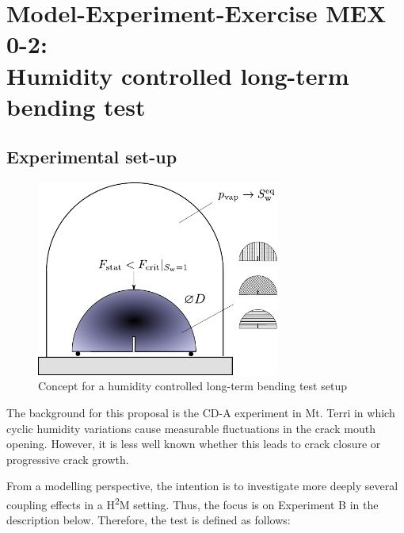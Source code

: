 \section[MEX 0-2: Humidity controlled long-term bending test]{Model-Experiment-Exercise MEX 0-2:\\Humidity controlled long-term bending test}
\label{sec:mex13}
\subsection{Experimental set-up}
\begin{figure}
\centering
\includegraphics[width=8cm]{figures/GeomInt_MEx13.pdf}
\caption{Concept for a humidity controlled long-term bending test setup}
\label{fig:GeomInt_MEx13}
\end{figure}
The background for this proposal is the CD-A experiment in Mt. Terri in which cyclic humidity variations cause measurable fluctuations in the crack mouth opening. However, it is less well known whether this leads to crack closure or progressive crack growth. 

From a modelling perspective, the intention is to investigate more deeply several coupling effects in a H\textsuperscript{2}M setting. Thus, the focus is on Experiment B in the description below. Therefore, the test is defined as follows:

